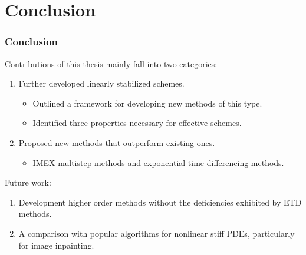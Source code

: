 \documentclass[hyperref={pdfpagelabels=false}]{beamer}
\begin{document}
\section{Conclusion}
\begin{frame}
	\frametitle{Conclusion}
	Contributions of this thesis mainly fall into two categories:
\begin{enumerate}
	\item Further developed linearly stabilized schemes.
	\begin{itemize}
		\item Outlined a framework for developing new methods of this type. 
		
		\item Identified three properties necessary for effective schemes. 
	\end{itemize}
	
	\item Proposed new methods that outperform existing ones. 
	\begin{itemize}
		\item IMEX multistep methods and exponential time differencing methods. 
	\end{itemize}
\end{enumerate}	

Future work: 
\begin{enumerate}
	\item Development higher order methods without the deficiencies exhibited by ETD methods.
	
	\item A comparison with popular algorithms for nonlinear stiff PDEs, particularly for image inpainting.
\end{enumerate}
\end{frame}
\end{document}
